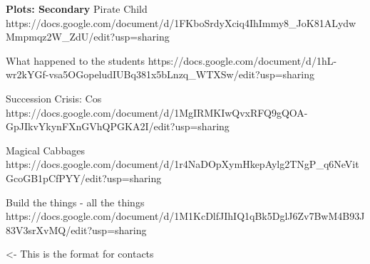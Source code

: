 \documentclass[char]{GL2020}
\begin{document}
\textbf{Plots: Secondary}
Pirate Child
https://docs.google.com/document/d/1FKboSrdyXciq4IhImmy8_JoK81ALydwMmpmqz2W_ZdU/edit?usp=sharing

What happened to the students
https://docs.google.com/document/d/1hL-wr2kYGf-vsa5OGopeludIUBq381x5bLnzq_WTXSw/edit?usp=sharing

Succession Crisis: Cos
https://docs.google.com/document/d/1MgIRMKIwQvxRFQ9gQOA-GpJIkvYkynFXnGVhQPGKA2I/edit?usp=sharing

Magical Cabbages
https://docs.google.com/document/d/1r4NaDOpXymHkepAylg2TNgP_q6NeVitGcoGB1pCfPYY/edit?usp=sharing

Build the things - all the things
https://docs.google.com/document/d/1M1KcDlfJIhIQ1qBk5DglJ6Zv7BwM4B93J83V3srXvMQ/edit?usp=sharing

\begin{itemz}[Goals]
	\item 
\end{itemz}

\begin{itemz}[Notes]
	\item 
\end{itemz}

\begin{contacts}
	\contact{\cTest{}} <- This is the format for contacts 
\end{contacts}
\end{document}
